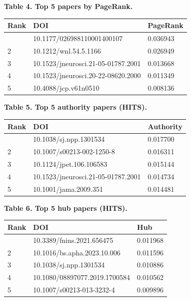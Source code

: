 \documentclass[
  english,
]{article}
\newcounter{none} %
\begin{document}
\textbf{Table 4. Top 5 papers by PageRank.}

{\def\LTcaptype{none} %
\begin{longtable}[]{@{}lll@{}}
\toprule\noalign{}
Rank & DOI & PageRank \\
\midrule\noalign{}
\endhead
\bottomrule\noalign{}
\endlastfoot
1 & 10.1177/026988110001400107 & 0.036943 \\
2 & 10.1212/wnl.54.5.1166 & 0.026949 \\
3 & 10.1523/jneurosci.21-05-01787.2001 & 0.013668 \\
4 & 10.1523/jneurosci.20-22-08620.2000 & 0.011349 \\
5 & 10.4088/jcp.v61n0510 & 0.008136 \\
\end{longtable}
}

\textbf{Table 5. Top 5 authority papers (HITS).}

{\def\LTcaptype{none} %
\begin{longtable}[]{@{}lll@{}}
\toprule\noalign{}
Rank & DOI & Authority \\
\midrule\noalign{}
\endhead
\bottomrule\noalign{}
\endlastfoot
1 & 10.1038/sj.npp.1301534 & 0.017700 \\
2 & 10.1007/s00213-002-1250-8 & 0.016311 \\
3 & 10.1124/jpet.106.106583 & 0.015144 \\
4 & 10.1523/jneurosci.21-05-01787.2001 & 0.014734 \\
5 & 10.1001/jama.2009.351 & 0.014481 \\
\end{longtable}
}

\textbf{Table 6. Top 5 hub papers (HITS).}

{\def\LTcaptype{none} %
\begin{longtable}[]{@{}lll@{}}
\toprule\noalign{}
Rank & DOI & Hub \\
\midrule\noalign{}
\endhead
\bottomrule\noalign{}
\endlastfoot
1 & 10.3389/fnins.2021.656475 & 0.011968 \\
2 & 10.1016/bs.apha.2023.10.006 & 0.011596 \\
3 & 10.1038/sj.npp.1301534 & 0.010886 \\
4 & 10.1080/08897077.2019.1700584 & 0.010562 \\
5 & 10.1007/s00213-013-3232-4 & 0.009896 \\
\end{longtable}
}
\end{document}
